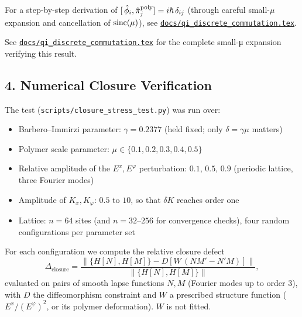 \documentclass[12pt]{article}
\begin{document}
\smallskip
\noindent
For a step-by-step derivation of
\([\,\hat\phi_i,\hat\pi_j^{\rm poly}]=i\hbar\,\delta_{ij}\)
(through careful small-\(\mu\) expansion and cancellation of \(\operatorname{sinc}(\mu)\)), see
\href{https://github.com/arcticoder/warp-bubble-qft/blob/main/docs/qi_discrete_commutation.tex}{\texttt{docs/qi\_discrete\_commutation.tex}}.

\smallskip
\noindent
See 
\href{https://github.com/arcticoder/warp-bubble-qft/blob/main/docs/qi_discrete_commutation.tex}
     {\texttt{docs/qi\_discrete\_commutation.tex}} 
for the complete small-μ expansion verifying this result.
\smallskip

\subsection*{4. Numerical Closure Verification}
The test (\texttt{scripts/closure\_stress\_test.py}) was run over:
\begin{itemize}
  \item Barbero--Immirzi parameter: $\gamma=0.2377$ (held fixed; only $\delta=\gamma\mu$ matters)
  \item Polymer scale parameter: $\mu \in \{0.1,0.2,0.3,0.4,0.5\}$
  \item Relative amplitude of the $E^x,E^\varphi$ perturbation: $0.1$, $0.5$, $0.9$ (periodic lattice, three Fourier modes)
  \item Amplitude of $K_x,K_\varphi$: $0.5$ to $10$, so that $\delta K$ reaches order one
  \item Lattice: $n=64$ sites (and $n=32$--$256$ for convergence checks), four random configurations per parameter set
\end{itemize}

For each configuration we compute the relative closure defect
\[
  \Delta_{\text{closure}} = \frac{\left\| \{H[N],H[M]\} - D\!\left[W\,(NM'-N'M)\right]\right\|}{\left\|\{H[N],H[M]\}\right\|},
\]
evaluated on pairs of smooth lapse functions $N,M$ (Fourier modes up to order 3), with $D$ the diffeomorphism constraint and $W$ a prescribed structure function ($E^x/(E^\varphi)^2$, or its polymer deformation).  $W$ is not fitted.
\end{document}
